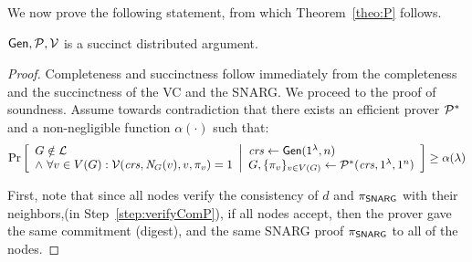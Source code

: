 We now prove the following statement, from which Theorem~\ref{theo:P} follows.
\begin{claim}
$\mathsf{Gen}, \mathcal{P}, \mathcal{V}$ is a succinct distributed argument.
\end{claim}

\begin{proof}%
    Completeness and succinctness follow immediately from the completeness and the succinctness of the VC and the SNARG. We proceed to the proof of soundness.
    Assume towards contradiction that there exists an efficient prover $\mathcal{P}^*$ and a non-negligible function $\alpha(\cdot)$ such that:
    \begin{gather}\label{eq:soundnessBreakP}
        \underset{}{\text{Pr}}\left [
        \begin{array}{ll}
        G\notin \mathcal{L} \\
        \wedge\ \forall v\in V(G) : \mathcal{V}(\mathit{ crs }, \mathit{ N }_G(v), v, \pi_v) = 1
        \end{array}
        \middle\vert
        \begin{array}{ll}
        \mathit{ crs } \leftarrow \mathsf{Gen}(1^\lambda, n) \\
        G, \{\pi_{v}\}_{v\in V(G)} \leftarrow \mathcal{P}^*(\mathit{ crs }, 1^\lambda, 1^n) \\
        \end{array}
        \right ] \geq \alpha(\lambda)
    \end{gather}

    First, note that since all nodes verify the consistency of $d$ and $\pi_{\mathsf{SNARG}}$ with their neighbors,(in Step~\ref{step:verifyComP}), if all nodes accept, then the prover gave the same commitment (digest), and the same SNARG proof $\pi_{\mathsf{SNARG}}$ to all of the nodes.
    

\end{proof}
